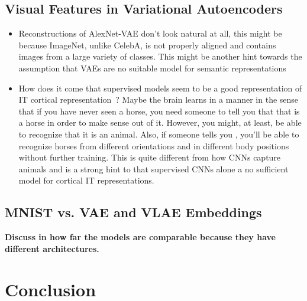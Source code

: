 \documentclass[11pt]{article}
\begin{document}
    \subsection{Visual Features in Variational Autoencoders}\label{subsec:discussion_visual_features_in_variational_autoencoders}
    \begin{itemize}
        \item Reconstructions of AlexNet-VAE don't look natural at all, this might be because ImageNet, unlike CelebA, is not properly aligned and contains images from a large variety of classes.
        This might be another hint towards the assumption that \acp{VAE} are no suitable model for semantic representations
        \item How does it come that supervised models seem to be a good representation of \ac{IT} cortical representation~\citep{khaligh2014deep}? Maybe the brain learns in a  manner in the sense that if you have never seen a horse, you need someone to tell you that that is a horse in order to make sense out of it.
However, you might, at least, be able to recognize that it is an animal.
Also, if someone tells you , you'll be able to recognize horses from different orientations and in different body positions without further training.
This is quite different from how \acp{CNN} capture animals and is a strong hint to that supervised \acp{CNN} alone a no sufficient model for cortical IT representations.
\end{itemize}

\subsection{MNIST vs. VAE and VLAE Embeddings}

\textbf{Discuss in how far the models are comparable because they have different architectures.}

\section{Conclusion}\label{sec:conclusion}

\newpage
\printbibliography

\newpage
\appendix
\end{document}
